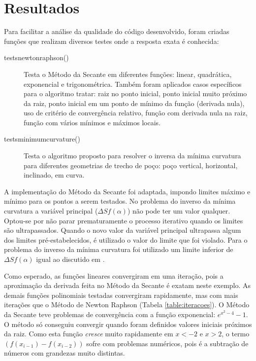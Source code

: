 \documentclass[final,5p]{elsarticle}
\numberwithin{equation}{section}
\begin{document}
    \section{Resultados}
    
    Para facilitar a análise da qualidade do código desenvolvido, foram criadas funções que realizam diversos testes onde a resposta exata é conhecida:

    \begin{description}
        \item[tests\textunderscore newton\textunderscore raphson()] Testa o Método da Secante em diferentes funções: linear, quadrática, exponencial e trigonométrica. Também foram aplicados casos específicos para o algoritmo tratar: raiz no ponto inicial, ponto inicial muito próximo da raiz, ponto inicial em um ponto de mínimo da função (derivada nula), uso de critério de convergência relativo, função com derivada nula na raiz, função com vários mínimos e máximos locais.
        
        \item[tests\textunderscore minimum\textunderscore curvature()] Testa o algoritmo proposto para resolver o inversa da mínima curvatura para diferentes geometrias de trecho de poço: poço vertical, horizontal, inclinado, em curva.
    \end{description}

    A implementação do Método da Secante foi adaptada, impondo limites máximo e mínimo para os pontos a serem testados. No problema do inverso da mínima curvatura a variável principal ($\Delta S f(\alpha)$) não pode ter um valor qualquer. Optou-se por não parar prematuramente o processo iterativo quando os limites são ultrapassados. Quando o novo valor da variável principal ultrapassa algum dos limites pré-estabelecidos, é utilizado o valor do limite que foi violado. Para o problema do inverso da mínima curvatura foi utilizado um limite inferior de $\Delta S f(\alpha)$ igual ao discutido em \cite{relatoriobisseccao}.

    Como esperado, as funções lineares convergiram em uma iteração, pois a aproximação da derivada feita no Método da Secante é exatam neste exemplo. As demais funções polinomiais testadas convergiram rapidamente, mas com mais iterações que o Método de Newton Raphson (Tabela \ref{table:iteracoes}). O Método da Secante teve problemas de convergência com a função exponencial: $e^{x^2-4}-1$. O método só conseguiu convergir quando foram definidos valores iniciais próximos da raiz. Como esta função \emph{cresce} muito rapidamente em $x<-2$ e $x>2$, o termo $(f(x_{i-1})-f(x_{i-2}))$ sofre com problemas numéricos, pois é a subtração de números com grandezas muito distintas.
\end{document}
